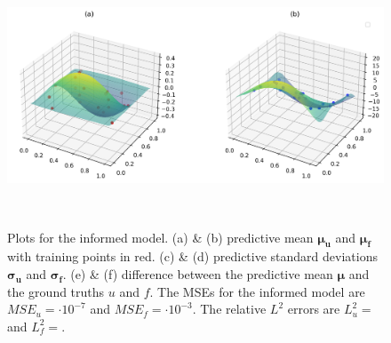 \documentclass{article}
\begin{document}
\begin{figure}
    \centering
    \includegraphics[width=1\textwidth]{../final_examples/wave_equation/predictive_mean.png}
    \caption{Plots for the informed model. (a) \& (b) predictive mean $\bm{\mu_u}$ and $\bm{\mu_f}$ with training points in red. (c) \& (d) predictive standard deviations $\bm{\sigma_u}$ and $\bm{\sigma_f}$. (e) \& (f) difference between the predictive mean $\bm{\mu}$ and the ground truths $u$ and $f$. The MSEs for the informed model are $MSE_u =  \cdot 10^{-7}$ and $MSE_f =  \cdot 10^{-3}$. The relative $L^2$ errors are $L^2_u = $ and $L^2_f = $.}
    ~\label{fig:wave}
\end{figure}
\end{document}
